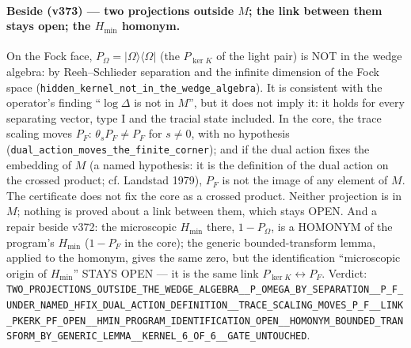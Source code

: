 \documentclass[11pt]{article}
\theoremstyle{definition}\newtheorem{deriv}{Derivation}
\begin{document}
\paragraph*{Beside (v373) --- two projections outside $M$; the link between them stays open; the $H_{\min}$ homonym.} On the Fock face, $P_\Omega=|\Omega\rangle\langle\Omega|$ (the $P_{\ker K}$ of the light pair) is NOT in the wedge algebra: by Reeh--Schlieder separation and the infinite dimension of the Fock space (\texttt{hidden\_kernel\_not\_in\_the\_wedge\_algebra}). It is consistent with the operator's finding ``$\log\Delta$ is not in $M$'', but it does not imply it: it holds for every separating vector, type I and the tracial state included. In the core, the trace scaling moves $P_F$: $\theta_s P_F\neq P_F$ for $s\neq 0$, with no hypothesis (\texttt{dual\_action\_moves\_the\_finite\_corner}); and if the dual action fixes the embedding of $M$ (a named hypothesis: it is the definition of the dual action on the crossed product; cf. Landstad 1979), $P_F$ is not the image of any element of $M$. The certificate does not fix the core as a crossed product. Neither projection is in $M$; nothing is proved about a link between them, which stays OPEN. And a repair beside v372: the microscopic $H_{\min}$ there, $1-P_\Omega$, is a HOMONYM of the program's $H_{\min}$ ($1-P_F$ in the core); the generic bounded-transform lemma, applied to the homonym, gives the same zero, but the identification ``microscopic origin of $H_{\min}$'' STAYS OPEN --- it is the same link $P_{\ker K}\leftrightarrow P_F$. Verdict: \texttt{TWO\_PROJECTIONS\_OUTSIDE\_THE\_WEDGE\_ALGEBRA\_\_P\_OMEGA\_BY\_SEPARATION\_\_P\_F\_UNDER\_NAMED\_HFIX\_DUAL\_ACTION\_DEFINITION\_\_TRACE\_SCALING\_MOVES\_P\_F\_\_LINK\_PKERK\_PF\_OPEN\_\_HMIN\_PROGRAM\_IDENTIFICATION\_OPEN\_\_HOMONYM\_BOUNDED\_TRANSFORM\_BY\_GENERIC\_LEMMA\_\_KERNEL\_6\_OF\_6\_\_GATE\_UNTOUCHED}.
\end{document}
